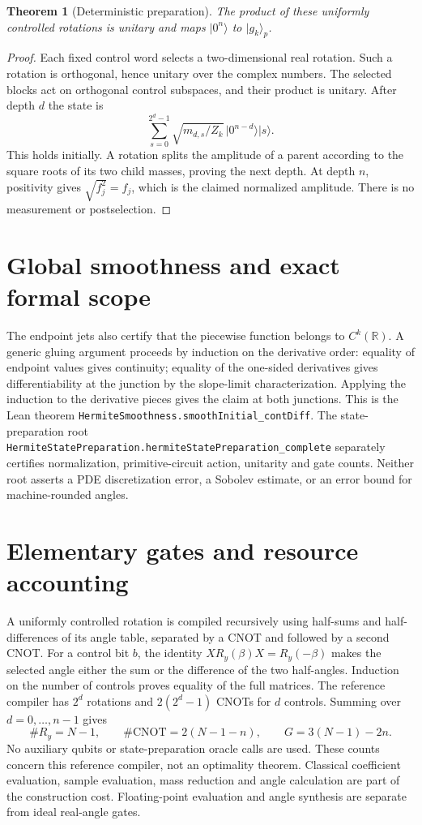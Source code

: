 \documentclass[11pt]{article}
\newtheorem{theorem}{Theorem}
\newcommand{\ket}[1]{\lvert #1\rangle}
\begin{document}
\begin{theorem}[Deterministic preparation]
The product of these uniformly controlled rotations is unitary and maps
$\ket{0^n}$ to $\ket{g_k}_p$.
\end{theorem}
\begin{proof}
Each fixed control word selects a two-dimensional real rotation. Such a
rotation is orthogonal, hence unitary over the complex numbers. The selected
blocks act on orthogonal control subspaces, and their product is unitary.
After depth $d$ the state is
\[
\sum_{s=0}^{2^d-1}\sqrt{m_{d,s}/Z_k}\,
   \ket{0^{n-d}}\ket{s}.
\]
This holds initially. A rotation splits the amplitude of a parent according
to the square roots of its two child masses, proving the next depth.
At depth $n$, positivity gives $\sqrt{f_j^2}=f_j$, which is the claimed
normalized amplitude. There is no measurement or postselection.
\end{proof}

\section{Global smoothness and exact formal scope}
The endpoint jets also certify that the piecewise function belongs to
$C^k(\mathbb R)$. A generic gluing argument proceeds by induction on the
derivative order: equality of endpoint values gives continuity; equality
of the one-sided derivatives gives differentiability at the junction by
the slope-limit characterization. Applying the induction to the derivative
pieces gives the claim at both junctions.
This is the Lean theorem
\texttt{HermiteSmoothness.smoothInitial\_contDiff}.
The state-preparation root
\texttt{HermiteStatePreparation.hermiteStatePreparation\_complete}
separately certifies normalization, primitive-circuit action, unitarity and
gate counts. Neither root asserts a PDE discretization error, a Sobolev
estimate, or an error bound for machine-rounded angles.

\section{Elementary gates and resource accounting}
A uniformly controlled rotation is compiled recursively using half-sums
and half-differences of its angle table, separated by a CNOT and followed
by a second CNOT. For a control bit $b$, the identity
$X R_y(\beta)X=R_y(-\beta)$ makes the selected angle either
the sum or the difference of the two half-angles.
Induction on the number of controls proves equality of the full matrices.
The reference compiler has $2^d$ rotations and $2(2^d-1)$ CNOTs for $d$
controls. Summing over $d=0,\ldots,n-1$ gives
\[
\#R_y=N-1,\qquad \#\mathrm{CNOT}=2(N-1-n),
\qquad G=3(N-1)-2n.
\]
No auxiliary qubits or state-preparation oracle calls are used. These
counts concern this reference compiler, not an optimality theorem.
Classical coefficient evaluation, sample evaluation, mass reduction and
angle calculation are part of the construction cost. Floating-point
evaluation and angle synthesis are separate from ideal real-angle gates.
\end{document}

